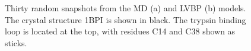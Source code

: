 \documentclass[journal=jacsat,manuscript=article]{achemso}
\begin{document}
\begin{figure}

\caption{
Thirty random snapshots from the MD (a) and LVBP (b) models.  The crystal structure 1BPI \cite{parkin1996structure} is shown in black.  The trypsin binding loop is located at the top, with residues C14 and C38 shown as sticks.  
}
\label{figure:PDB_BPTI}
\end{figure}


\newpage
\end{document}
